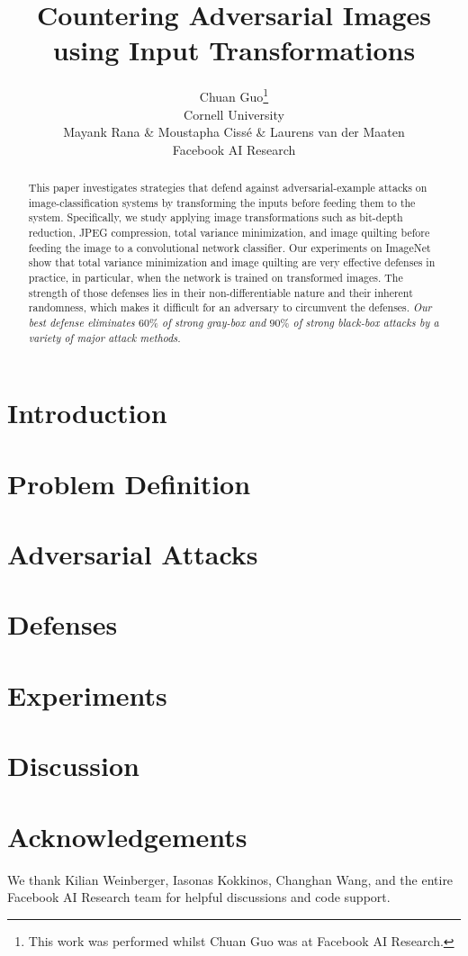\documentclass{article} %
\title{Countering Adversarial Images\\using Input Transformations}
\author{Chuan Guo\thanks{This work was performed whilst Chuan Guo was at Facebook AI Research.}\\
Cornell University\\
\And
Mayank Rana \& Moustapha Ciss{\'e} \& Laurens van der Maaten\\
Facebook AI Research\\
}
\begin{document}
\maketitle

\begin{abstract}
This paper investigates strategies that defend against adversarial-example attacks on image-classification systems by transforming the inputs before feeding them to the system. Specifically, we study applying image transformations such as bit-depth reduction, JPEG compression, total variance minimization, and image quilting before feeding the image to a convolutional network classifier. Our experiments on ImageNet show that total variance minimization and image quilting are very effective defenses in practice, in particular, when the network is trained on transformed images. The strength of those defenses lies in their non-differentiable nature and their inherent randomness, which makes it difficult for an adversary to circumvent the defenses. \emph{Our best defense eliminates $60\%$ of strong gray-box and $90\%$ of strong black-box attacks by a variety of major attack methods.}
\end{abstract}

\section{Introduction}
\label{introduction}


\section{Problem Definition}
\label{definition}


\section{Adversarial Attacks}
\label{attacks}


\section{Defenses}
\label{defenses}


\section{Experiments}
\label{experiment}


\section{Discussion}
\label{conclusion}


\section*{Acknowledgements}
We thank Kilian Weinberger, Iasonas Kokkinos, Changhan Wang, and the entire Facebook AI Research team for helpful discussions and code support.



\end{document}
